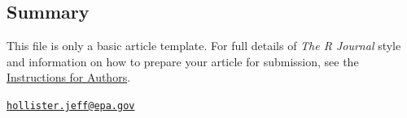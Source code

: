 \subsection{Summary}\label{summary}

This file is only a basic article template. For full details of
\emph{The R Journal} style and information on how to prepare your
article for submission, see the
\href{https://journal.r-project.org/share/author-guide.pdf}{Instructions
for Authors}.



\address{%
Jeffrey W. Hollister\\
U.S. Environmental Protection Agency\\
Office of Research and Development\\ National Health and Environmental Effects Research Laboratory\\ Atlantic Ecology Division\\ 27 Tarzwell Drive\\ Narragansett, RI 02882\\
}
\href{mailto:hollister.jeff@epa.gov}{\nolinkurl{hollister.jeff@epa.gov}}

